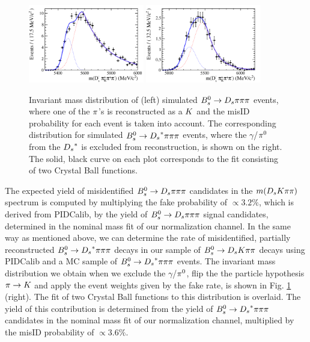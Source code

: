 \begin{figure}[h]
\includegraphics[height=6.cm,width=0.45\textwidth]{figs/Bs2Dspipipi_as_DsKpipi.pdf}
\includegraphics[height=6.cm,width=0.45\textwidth]{figs/Bs2Dsstarpipipi_as_DsKpipi.pdf}
\caption{Invariant mass distribution of (left) simulated ${{B}^0_{s}}\rightarrow{\ensuremath{{D}_{s}}}{\ensuremath{\pi}}{\ensuremath{\pi}}{\ensuremath{\pi}}$ events, where one of the ${\pi}$'s is reconstructed as a ${K}$ and the misID probability for each event is taken into account. 
The corresponding distribution for simulated ${{B}^0_{s}}\rightarrow{\ensuremath{{D}_{s}}}^{*}{\pi}{\pi}{\pi}$ events, where the $\gamma$/${{\pi}^0}$ from the ${{D}_{s}}^{*}$ is excluded from reconstruction, is shown on the right.
The solid, black curve on each plot corresponds to the fit consisting of two Crystal Ball functions.}
\label{fig: BsDspipipiMCmissID}
\end{figure}
 
The expected yield of misidentified ${{B}^0_{s}}\rightarrow{\ensuremath{{D}_{s}}}{\ensuremath{\pi}}{\ensuremath{\pi}}{\ensuremath{\pi}}$ candidates in the $m({{D}_{s}}{K}{\pi}{\pi})$ spectrum is computed by multiplying the fake probability of $\propto3.2\%$, which is derived from PIDCalib, by the yield of ${{B}^0_{s}}\rightarrow{\ensuremath{{D}_{s}}}{\ensuremath{\pi}}{\ensuremath{\pi}}{\ensuremath{\pi}}$ signal candidates, determined in the nominal mass fit of our normalization channel.  \newline
In the same way as mentioned above, we can determine the rate of misidentified, partially reconstructed ${{B}^0_{s}}\rightarrow{\ensuremath{{D}_{s}}}^{*}{\pi}{\pi}{\pi}$ decays in our sample of ${{B}^0_{s}}\rightarrow{\ensuremath{{D}_{s}}}{\ensuremath{K}}{\ensuremath{\pi}}{\ensuremath{\pi}}$ decays using PIDCalib and a MC sample of ${{B}^0_{s}}\rightarrow{\ensuremath{{D}_{s}}}^{*}{\pi}{\pi}{\pi}$ events. The invariant mass distribution we obtain when we exclude the $\gamma$/${{\pi}^0}$, flip the the particle hypothesis ${\pi}\rightarrow{\ensuremath{K}}$ and apply the event weights given by the fake rate, is shown in Fig. \ref{fig: BsDspipipiMCmissID} (right). The fit of two Crystal Ball functions to this distribution is overlaid. 
The yield of this contribution is determined from the yield of ${{B}^0_{s}}\rightarrow{\ensuremath{{D}_{s}}}^{*}{\pi}{\pi}{\pi}$ candidates in the nominal mass fit of our normalization channel, multiplied by the misID probability of $\propto 3.6\%$.
 




